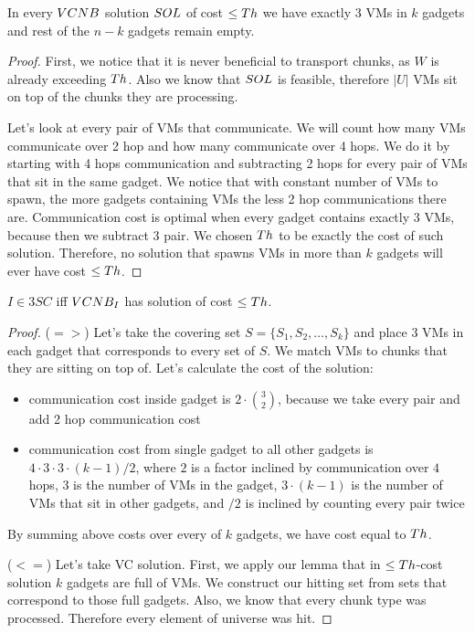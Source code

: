 \begin{lemma}
In every $VCNB$ solution $SOL$ of cost $\leq Th$ we have exactly
$3$ VMs in $k$ gadgets and rest of the $n-k$ gadgets remain empty.
\end{lemma}
\begin{proof}
First, we notice that it is never beneficial to
transport chunks, as $W$ is already exceeding $Th$. Also we know that
$SOL$ is feasible, therefore $|U|$ VMs sit on top of the chunks they
are processing.

Let's look at every pair of VMs that communicate. We
will count how many VMs communicate over 2 hop and how many
communicate over 4 hops. We do it by starting with 4 hops
communication and subtracting 2 hops for every pair of VMs that sit in
the same gadget. We notice that with constant number of VMs to spawn,
the more gadgets containing VMs the less 2 hop communications there
are. Communication cost is optimal when every gadget contains exactly
3 VMs, because then we subtract 3 pair. We chosen $Th$ to be exactly
the cost of such solution. Therefore, no solution that spawns VMs in
more than $k$ gadgets will ever have cost $\leq Th$.
\end{proof}

\begin{theorem}
$I \in 3SC$ iff $VCNB_I$ has solution of cost $\leq Th$.
\end{theorem}
\begin{proof}

($=>$) Let's take the covering set $S = \{S_1, S_2, \ldots, S_k\}$ and place $3$ VMs in each gadget that
corresponds to every set of $S$. We match VMs to chunks that they
are sitting on top of. Let's calculate the cost of the solution:
\begin{itemize}
\item communication cost inside gadget is $2 \cdot {3 \choose 2}$,
  because we take every pair and add 2 hop communication cost
\item communication cost from single gadget to all other gadgets is $4
  \cdot 3 \cdot 3 \cdot (k - 1) / 2$, where $2$ is a factor inclined by
  communication over $4$ hops, $3$ is the number of VMs in the gadget,
  $3 \cdot (k-1)$ is the number of VMs that sit in other gadgets, and
  $/2$ is inclined by counting every pair twice
\end{itemize}

By summing above costs over every of $k$ gadgets, we have cost equal
to $Th$.

($<=$) Let's take VC solution. First, we apply our lemma that in $\leq
Th$-cost
solution $k$ gadgets are full of VMs. We construct our hitting set from
sets that correspond to those full gadgets. Also, we know that every
chunk type was processed. Therefore every element of universe was hit.
\end{proof}

